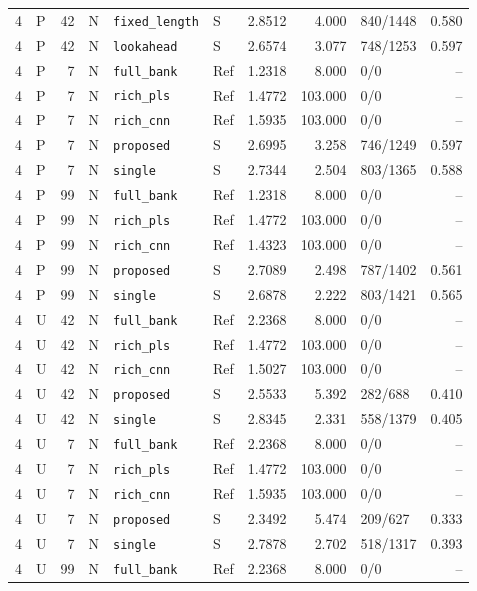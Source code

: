 \documentclass[10pt,a4paper]{article}
\begin{document}
\begin{longtable}{rlrlllrrlr}
4 & P & 42 & N & \texttt{fixed\_length} & S & 2.8512 & 4.000 & 840/1448 & 0.580 \\
4 & P & 42 & N & \texttt{lookahead} & S & 2.6574 & 3.077 & 748/1253 & 0.597 \\
4 & P & 7 & N & \texttt{full\_bank} & Ref & 1.2318 & 8.000 & 0/0 & -- \\
4 & P & 7 & N & \texttt{rich\_pls} & Ref & 1.4772 & 103.000 & 0/0 & -- \\
4 & P & 7 & N & \texttt{rich\_cnn} & Ref & 1.5935 & 103.000 & 0/0 & -- \\
4 & P & 7 & N & \texttt{proposed} & S & 2.6995 & 3.258 & 746/1249 & 0.597 \\
4 & P & 7 & N & \texttt{single} & S & 2.7344 & 2.504 & 803/1365 & 0.588 \\
4 & P & 99 & N & \texttt{full\_bank} & Ref & 1.2318 & 8.000 & 0/0 & -- \\
4 & P & 99 & N & \texttt{rich\_pls} & Ref & 1.4772 & 103.000 & 0/0 & -- \\
4 & P & 99 & N & \texttt{rich\_cnn} & Ref & 1.4323 & 103.000 & 0/0 & -- \\
4 & P & 99 & N & \texttt{proposed} & S & 2.7089 & 2.498 & 787/1402 & 0.561 \\
4 & P & 99 & N & \texttt{single} & S & 2.6878 & 2.222 & 803/1421 & 0.565 \\
4 & U & 42 & N & \texttt{full\_bank} & Ref & 2.2368 & 8.000 & 0/0 & -- \\
4 & U & 42 & N & \texttt{rich\_pls} & Ref & 1.4772 & 103.000 & 0/0 & -- \\
4 & U & 42 & N & \texttt{rich\_cnn} & Ref & 1.5027 & 103.000 & 0/0 & -- \\
4 & U & 42 & N & \texttt{proposed} & S & 2.5533 & 5.392 & 282/688 & 0.410 \\
4 & U & 42 & N & \texttt{single} & S & 2.8345 & 2.331 & 558/1379 & 0.405 \\
4 & U & 7 & N & \texttt{full\_bank} & Ref & 2.2368 & 8.000 & 0/0 & -- \\
4 & U & 7 & N & \texttt{rich\_pls} & Ref & 1.4772 & 103.000 & 0/0 & -- \\
4 & U & 7 & N & \texttt{rich\_cnn} & Ref & 1.5935 & 103.000 & 0/0 & -- \\
4 & U & 7 & N & \texttt{proposed} & S & 2.3492 & 5.474 & 209/627 & 0.333 \\
4 & U & 7 & N & \texttt{single} & S & 2.7878 & 2.702 & 518/1317 & 0.393 \\
4 & U & 99 & N & \texttt{full\_bank} & Ref & 2.2368 & 8.000 & 0/0 & -- \\

\end{longtable}
\end{document}
